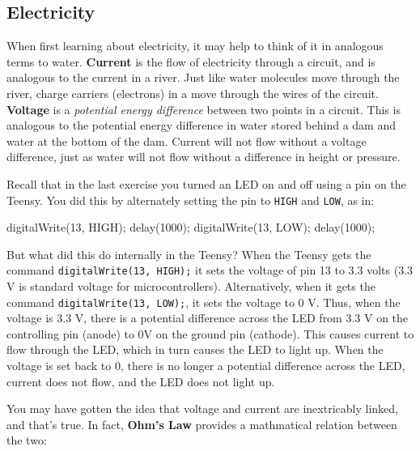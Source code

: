 \documentclass[]{book}
\newenvironment{Shaded}{\begin{snugshade}}{\end{snugshade}}
\newcommand{\DecValTok}[1]{\textcolor[rgb]{0.00,0.00,0.81}{#1}}
\newcommand{\NormalTok}[1]{#1}
\begin{document}
\hypertarget{electricity}{%
\subsection*{Electricity}\label{electricity}}

When first learning about electricity, it may help to think of it in analogous terms to water. \textbf{Current} is the flow of electricity through a circuit, and is analogous to the current in a river. Just like water molecules move through the river, charge carriers (electrons) in a move through the wires of the circuit. \textbf{Voltage} is a \emph{potential energy difference} between two points in a circuit. This is analogous to the potential energy difference in water stored behind a dam and water at the bottom of the dam. Current will not flow without a voltage difference, just as water will not flow without a difference in height or pressure.

Recall that in the last exercise you turned an LED on and off using a pin on the Teensy. You did this by alternately setting the pin to \texttt{HIGH} and \texttt{LOW}, as in:

\begin{Shaded}
\begin{Highlighting}[]
\NormalTok{    digitalWrite(}\DecValTok{13}\NormalTok{, HIGH);}
\NormalTok{    delay(}\DecValTok{1000}\NormalTok{);}
\NormalTok{    digitalWrite(}\DecValTok{13}\NormalTok{, LOW);}
\NormalTok{    delay(}\DecValTok{1000}\NormalTok{);}
\end{Highlighting}
\end{Shaded}

But what did this do internally in the Teensy? When the Teensy gets the command \texttt{digitalWrite(13,\ HIGH);} it sets the voltage of pin 13 to 3.3 volts (3.3 V is standard voltage for microcontrollers). Alternatively, when it gets the command \texttt{digitalWrite(13,\ LOW);}, it sets the voltage to 0 V. Thus, when the voltage is 3.3 V, there is a potential difference across the LED from 3.3 V on the controlling pin (anode) to 0V on the ground pin (cathode). This causes current to flow through the LED, which in turn causes the LED to light up. When the voltage is set back to 0, there is no longer a potential difference across the LED, current does not flow, and the LED does not light up.

You may have gotten the idea that voltage and current are inextricably linked, and that's true. In fact, \textbf{Ohm's Law} provides a mathmatical relation between the two:
\end{document}
